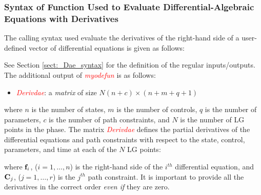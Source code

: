 \documentclass[10pt,final]{report}
\newcommand{\slred}[1]{\textcolor{red}{\sl #1}}
\begin{document}
\subsubsection{Syntax of Function Used to Evaluate Differential-Algebraic Equations with Derivatives}


The calling syntax used evaluate the derivatives of the right-hand side of a user-defined vector
of differential equations is given as follows:
\begin{center}
\end{center}
See Section \ref{sect:_Dae_syntax} for the definition of the regular inputs/outputs.
The additional output of \slred{myodefun} is as follows:
\begin{itemize}
  \item \slred{Derivdae}: a {\em matrix} of size $N(n+c) \times (n+m+q+1)$
\end{itemize}
where $n$ is the number of states, $m$ is the number of controls, $q$ is the number of parameters, $c$ is the number of path constraints, and $N$ is the number of LG points in the phase.  The matrix \slred{Derivdae} defines the partial derivatives of the differential equations and path constraints with respect to the state, control, parameters, and time at each of the $N$ LG points:
\begin{center}
\end{center}
where $\mathbf{f}_i$, ($i = 1,\ldots,n$) is the right-hand side of the $i^{th}$ differential equation, and $\mathbf{C}_j$, ($j = 1,\ldots,r$) is the $j^{th}$ path constraint. It is important to provide all the derivatives in the correct order {\em even if} they are zero.
\end{document}
